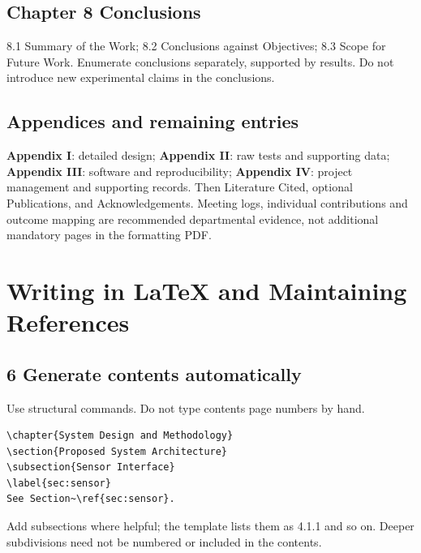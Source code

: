 \documentclass[11pt,a4paper]{article}
\newcommand{\Page}[1]{\clearpage\section*{#1}}
\newcommand{\Key}[1]{\textbf{#1}}
\begin{document}
\subsection*{Chapter 8 Conclusions}
8.1 Summary of the Work; 8.2 Conclusions against Objectives;
8.3 Scope for Future Work. Enumerate conclusions separately, supported by results.
Do not introduce new experimental claims in the conclusions.

\subsection*{Appendices and remaining entries}
\Key{Appendix I}: detailed design;
\Key{Appendix II}: raw tests and supporting data;
\Key{Appendix III}: software and reproducibility;
\Key{Appendix IV}: project management and supporting records.
Then Literature Cited, optional Publications, and Acknowledgements.
Meeting logs, individual contributions and outcome mapping are recommended
departmental evidence, not additional mandatory pages in the formatting PDF.

\Page{Writing in LaTeX and Maintaining References}
\subsection*{6 Generate contents automatically}
Use structural commands. Do not type contents page numbers by hand.
\begin{verbatim}
\chapter{System Design and Methodology}
\section{Proposed System Architecture}
\subsection{Sensor Interface}
\label{sec:sensor}
See Section~\ref{sec:sensor}.
\end{verbatim}
Add subsections where helpful; the template lists them as 4.1.1 and so on.
Deeper subdivisions need not be numbered or included in the contents.
\end{document}
